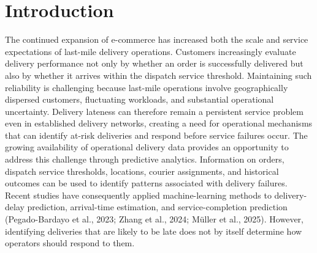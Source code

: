 \documentclass[11pt,a4paper]{article}
\begin{document}
\section{Introduction}\label{sec:introduction}

The continued expansion of e-commerce has increased both the scale and
service expectations of last-mile delivery operations. Customers
increasingly evaluate delivery performance not only by whether an order
is successfully delivered but also by whether it arrives within the
dispatch service threshold. Maintaining such reliability is challenging because
last-mile operations involve geographically dispersed customers,
fluctuating workloads, and substantial operational uncertainty. Delivery
lateness can therefore remain a persistent service problem even in
established delivery networks, creating a need for operational
mechanisms that can identify at-risk deliveries and respond before
service failures occur. The growing availability of operational delivery
data provides an opportunity to address this challenge through
predictive analytics. Information on orders, dispatch service thresholds,
locations, courier assignments, and historical outcomes can be used to
identify patterns associated with delivery failures. Recent studies have
consequently applied machine-learning methods to delivery-delay
prediction, arrival-time estimation, and service-completion prediction
(Pegado-Bardayo et al., 2023; Zhang et al., 2024; Müller et al., 2025).
However, identifying deliveries that are likely to be late does not by
itself determine how operators should respond to them.
\end{document}
